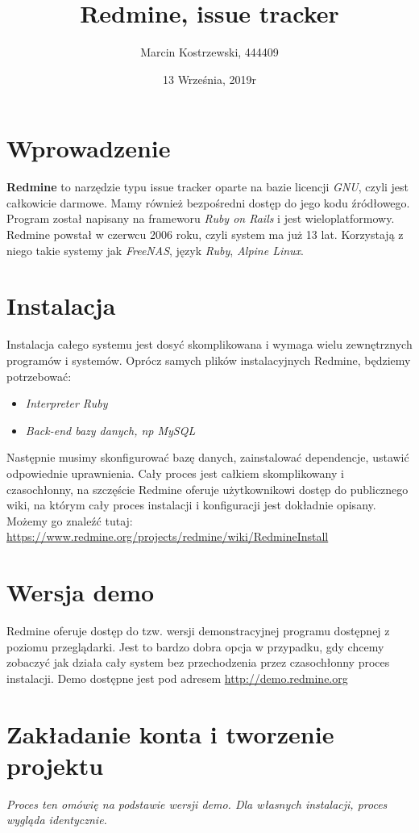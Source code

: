 \documentclass{article}
\title{Redmine, issue tracker}
\author{Marcin Kostrzewski, 444409}
\date{13 Września, 2019r}
\begin{document}
\maketitle
\newpage

\section{Wprowadzenie}
\textbf{Redmine} to narzędzie typu issue tracker oparte na bazie licencji
\textit{GNU}, czyli jest całkowicie darmowe. Mamy również bezpośredni
dostęp do jego kodu źródłowego. Program został napisany na frameworu
\textit{Ruby on Rails} i jest wieloplatformowy. Redmine powstał w czerwcu 2006 roku, czyli
system ma już 13 lat. Korzystają z niego takie systemy jak \textit{FreeNAS}, język \textit{Ruby}, \textit{Alpine Linux}.

\section{Instalacja}
Instalacja całego systemu jest dosyć skomplikowana i wymaga wielu
zewnętrznych programów i systemów. Oprócz samych plików instalacyjnych
Redmine, będziemy potrzebować:
\begin{itemize}
    \item \textit{Interpreter Ruby}
    \item \textit{Back-end bazy danych, np MySQL}
\end{itemize}
Następnie musimy skonfigurować bazę danych, zainstalować dependencje,
ustawić odpowiednie uprawnienia. Cały proces jest całkiem skomplikowany
i czasochłonny, na szczęście Redmine oferuje użytkownikowi dostęp do 
publicznego wiki, na którym cały proces instalacji i konfiguracji jest
dokładnie opisany. Możemy go znaleźć tutaj: \url{https://www.redmine.org/projects/redmine/wiki/RedmineInstall}

\section{Wersja demo}
Redmine oferuje dostęp do tzw. wersji demonstracyjnej programu
dostępnej z poziomu przeglądarki. Jest to bardzo dobra opcja
w przypadku, gdy chcemy zobaczyć jak działa cały system bez
przechodzenia przez czasochłonny proces instalacji.
Demo dostępne jest pod adresem \url{http://demo.redmine.org}

\section{Zakładanie konta i tworzenie projektu}
\textit{Proces ten omówię na podstawie wersji demo. Dla własnych
instalacji, proces wygląda identycznie.}
\newpage
\end{document}

